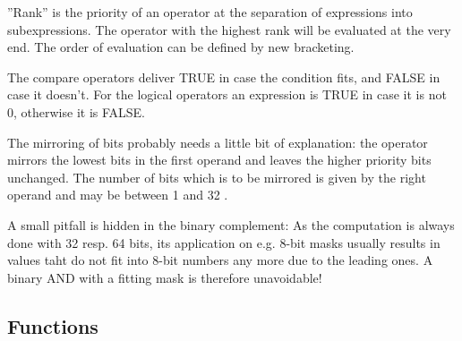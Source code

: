 \documentclass[12pt,twoside]{report}
\begin{document}
''Rank'' is the priority of an operator at the separation of expressions 
into subexpressions.  The operator with the highest rank will be 
evaluated at the very end.  The order of evaluation can be defined by 
new bracketing.

The compare operators deliver TRUE in case the condition fits, 
and FALSE in case it doesn't.  For the logical operators an expression 
is TRUE in case it is not 0, otherwise it is FALSE.

The mirroring of bits probably needs a little bit of explanation: the 
operator mirrors the lowest bits in the first operand and leaves the 
higher priority bits unchanged.  The number of bits which is to be 
mirrored is given by the right operand and may be between 1 and 32 .

A small pitfall is hidden in the binary complement: As the
computation is always done with 32 resp. 64 bits, its application on
e.g. 8-bit masks usually results in values taht do not fit into 8-bit
numbers any more due to the leading ones.  A binary AND with a
fitting mask is therefore unavoidable!

\subsection{Functions}
\end{document}
